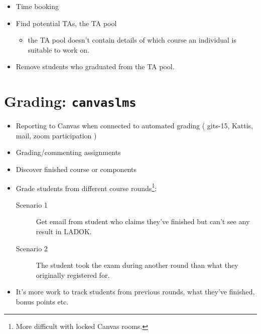 \begin{frame}[fragile]\label{WishTA}
  \begin{example}
    \begin{itemize}
      \item {Time booking}

      \item {Find potential TAs, the TA pool}
        \begin{itemize}
          \item {the TA pool doesn't contain details of which course 
            an individual is suitable to work on.}
        \end{itemize}

      \item {Remove students who graduated from the TA pool.}
    \end{itemize}
  \end{example}
\end{frame}


\section[Grading]{Grading: \texttt{canvaslms}}

\begin{frame}[fragile]
  \begin{example}[Grading]
    \begin{itemize}
      \item {Reporting to Canvas when connected to automated grading (\eg 
        gits-15, Kattis, mail, zoom participation \etc)}
      \item {Grading/commenting assignments}
    \end{itemize}
  \end{example}
\end{frame}

\begin{frame}
  \begin{example}
    \begin{itemize}
      \item {Discover finished course or components}
      \item {Grade students from different course rounds}\footnote{%
          More difficult with locked Canvas rooms.
        }:
        \begin{description}
          \item[Scenario 1] {Get email from student who claims they've 
            finished but can't see any result in LADOK.}

          \item[Scenario 2] The student took the exam during another round than 
            what they originally registered for.
        \end{description}

      \item {It's more work to track students from previous rounds, 
        what they've finished, bonus points etc.}
    \end{itemize}
  \end{example}
\end{frame}

